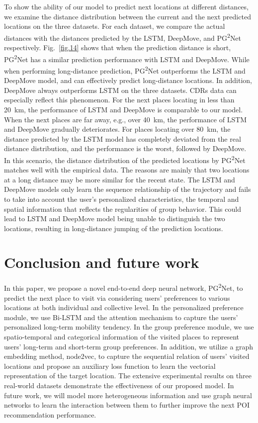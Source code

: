 \documentclass[10pt,journal,compsoc]{IEEEtran}
\begin{document}
To show the ability of our model to predict next locations at different distances, we examine the distance distribution between the current and the next predicted locations on the three datasets. For each dataset, we compare the actual distances with the distances predicted by the LSTM, DeepMove, and PG\textsuperscript{2}Net respectively. Fig.~\ref{fig.14} shows that when the prediction distance is short, PG\textsuperscript{2}Net has a similar prediction performance with LSTM and DeepMove. While when performing long-distance prediction, PG\textsuperscript{2}Net outperforms the LSTM and DeepMove model, and can effectively predict long-distance locations. In addition, DeepMove always outperforms LSTM on the three datasets. CDRs data can especially reflect this phenomenon. For the next places locating in less than 20~km, the performance of LSTM and DeepMove is comparable to our model. When the next places are far away, e.g., over 40~km, the performance of LSTM and DeepMove gradually deteriorates. For places locating over 80~km, the distance predicted by the LSTM model has completely deviated from the real distance distribution, and the performance is the worst, followed by DeepMove. In this scenario, the distance distribution of the predicted locations by PG\textsuperscript{2}Net matches well with the empirical data. The reasons are mainly that two locations at a long distance may be more similar for the recent state. The LSTM and DeepMove models only learn the sequence relationship of the trajectory and fails to take into account the user's personalized characteristics, the temporal and spatial information that reflects the regularities of group behavior. This could lead to LSTM and DeepMove model being unable to distinguish the two locations, resulting in long-distance jumping of the prediction locations.
\section{Conclusion and future work}
In this paper, we propose a novel end-to-end deep neural network, PG\textsuperscript{2}Net, to predict the next place to visit via considering users’ preferences to various locations at both individual and collective level. In the personalized preference module, we use Bi-LSTM and the attention mechanism to capture the users’ personalized long-term mobility tendency. In the group preference module, we use spatio-temporal and categorical information of the visited places to represent users' long-term and short-term group preferences. In addition, we utilize a graph embedding method, node2vec, to capture the sequential relation of users' visited locations and propose an auxiliary loss function to learn the vectorial representation of the target location. The extensive experimental results on three real-world datasets demonstrate the effectiveness of our proposed model. In future work, we will model more heterogeneous information and use graph neural networks to learn the interaction between them to further improve the next POI recommendation performance.
\end{document}
